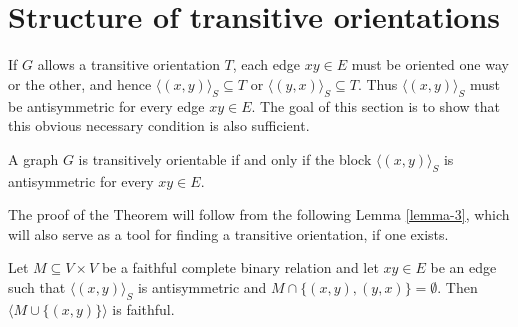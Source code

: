 \section{Structure of transitive orientations}

If $G$ allows a transitive orientation $T$, each edge $xy \in E$ must be oriented one way or the other, and hence $\langle(x, y)\rangle_S \subseteq T$ or $\langle(y, x)\rangle_S \subseteq T$. Thus $\langle(x, y)\rangle_S$ must be antisymmetric for every edge $xy \in E$. The goal of this section is to show that this obvious necessary condition is also sufficient.

\begin{thm}
	A graph $G$ is transitively orientable if and only if the block $\langle(x, y)\rangle_S$ is antisymmetric for every $xy \in E$.
	\label{thm-24}
\end{thm}

The proof of the Theorem will follow from the following Lemma \ref{lemma-3}, which will also serve as a tool for finding a transitive orientation, if one exists.

\begin{lemma}
	Let $M \subseteq V \times V$ be a faithful complete binary relation and let $xy \in E$ be an edge such that $\langle(x, y)\rangle_S$ is antisymmetric and $M \cap \{(x, y), (y, x)\} = \emptyset$. Then $\langle M \cup \{(x, y)\}\rangle$ is faithful.
	\label{lemma-3}
\end{lemma}

